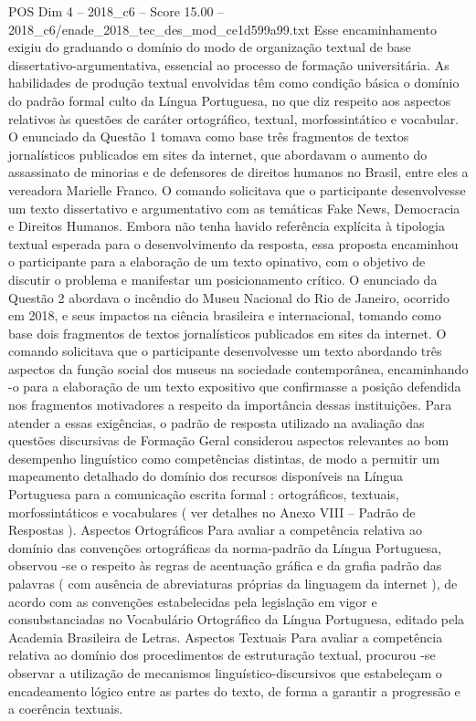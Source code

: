 \begin{textsample}{POS Dim 4 – 2018\_c6 – Score 15.00 – 2018\_c6/enade\_2018\_tec\_des\_mod\_ce1d599a99.txt}
Esse encaminhamento exigiu do graduando o domínio do modo de organização textual de base dissertativo-argumentativa, essencial ao processo de formação universitária.
As habilidades de produção textual envolvidas têm como condição básica o domínio do padrão formal culto da Língua Portuguesa, no que diz respeito aos aspectos relativos às questões de caráter ortográfico, textual, morfossintático e vocabular.
O enunciado da Questão 1 tomava como base três fragmentos de textos jornalísticos publicados em sites da internet, que abordavam o aumento do assassinato de minorias e de defensores de direitos humanos no Brasil, entre eles a vereadora Marielle Franco.
O comando solicitava que o participante desenvolvesse um texto dissertativo e argumentativo com as temáticas Fake News, Democracia e Direitos Humanos.
Embora não tenha havido referência explícita à tipologia textual esperada para o desenvolvimento da resposta, essa proposta encaminhou o participante para a elaboração de um texto opinativo, com o objetivo de discutir o problema e manifestar um posicionamento crítico.
O enunciado da Questão 2 abordava o incêndio do Museu Nacional do Rio de Janeiro, ocorrido em 2018, e seus impactos na ciência brasileira e internacional, tomando como base dois fragmentos de textos jornalísticos publicados em sites da internet.
O comando solicitava que o participante desenvolvesse um texto abordando três aspectos da função social dos museus na sociedade contemporânea, encaminhando -o para a elaboração de um texto expositivo que confirmasse a posição defendida nos fragmentos motivadores a respeito da importância dessas instituições.
Para atender a essas exigências, o padrão de resposta utilizado na avaliação das questões discursivas de Formação Geral considerou aspectos relevantes ao bom desempenho linguístico como competências distintas, de modo a permitir um mapeamento detalhado do domínio dos recursos disponíveis na Língua Portuguesa para a comunicação escrita formal : ortográficos, textuais, morfossintáticos e vocabulares ( ver detalhes no Anexo VIII – Padrão de Respostas ).
Aspectos Ortográficos Para avaliar a competência relativa ao domínio das convenções ortográficas da norma-padrão da Língua Portuguesa, observou -se o respeito às regras de acentuação gráfica e da grafia padrão das palavras ( com ausência de abreviaturas próprias da linguagem da internet ), de acordo com as convenções estabelecidas pela legislação em vigor e consubstanciadas no Vocabulário Ortográfico da Língua Portuguesa, editado pela Academia Brasileira de Letras.
Aspectos Textuais Para avaliar a competência relativa ao domínio dos procedimentos de estruturação textual, procurou -se observar a utilização de mecanismos linguístico-discursivos que estabeleçam o encadeamento lógico entre as partes do texto, de forma a garantir a progressão e a coerência textuais.

\end{textsample}
